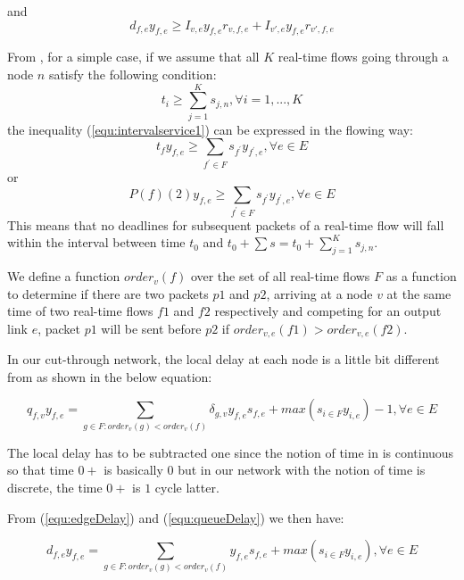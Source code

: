 \documentclass[10pt]{article}
\begin{document}
and
\begin{equation} 
d_{f,e}y_{f,e} \geq I_{v,e}y_{f,e}r_{v,f,e} + I_{v',e}y_{f,e}r_{v',f,e}
\end{equation}

From \cite{Ferrari90ascheme}, for a simple case, if we assume that all $K$ 
real-time flows going through a node $n$ satisfy the following condition:
\begin{equation}\label{equ:intervalservice1}
t_i \geq \sum_{j=1}^Ks_{j,n}, \forall i = 1,...,K
\end{equation}
the inequality (\ref{equ:intervalservice1}) can be expressed in the flowing way:
\begin{equation}
t_f y_{f,e}\geq \sum_{f^{'} \in F} s_{f^{'}}y_{f^{'},e}, \forall e \in E
\end{equation}
or
\begin{equation}
P(f)(2) y_{f,e}\geq \sum_{f^{'} \in F} s_{f^{'}}y_{f^{'},e}, \forall e \in E
\end{equation}
This means that no deadlines for subsequent packets of a real-time flow will fall within the interval 
between time $t_0$ and $t_0 + \sum s = t_0 + \sum_{j=1}^Ks_{j,n}$. 

We define a function $order_v(f)$ over the set of all real-time flows $F$
as a function to determine if there are two packets $p1$ and $p2$, arriving at a
node $v$ at the same time of two real-time flows $f1$ and $f2$ respectively
and competing for an output link $e$, packet $p1$ will be sent before $p2$ if
$order_{v,e}(f1) > order_{v,e}(f2)$.


In our cut-through network, the local delay at each node is a little bit
different from \cite{Ferrari90ascheme} as shown in the below equation:

\begin{equation}\label{equ:queueDelay}
q_{f,v}y_{f,e} = \sum_{g \in F:order_v(g) <
order_v(f)}\delta_{g,v}y_{f,e}s_{f,e} + max(s_{i \in F}y_{i,e})-1, \forall e \in
E
\end{equation}

The local delay has to be subtracted one since the notion of time in
\cite{Ferrari90ascheme} is continuous so that time $0+$ is basically $0$ but in
our network with the notion of time is discrete, the time $0+$ is $1$ cycle
latter.

From (\ref{equ:edgeDelay}) and (\ref{equ:queueDelay}) we then have:

\begin{equation}\label{equ:edgeDelay1}
d_{f,e}y_{f,e} = \sum_{g \in F:order_v(g) <
order_v(f)}y_{f,e}s_{f,e} + max(s_{i \in F}y_{i,e}), \forall e \in
E
\end{equation}
\end{document}
